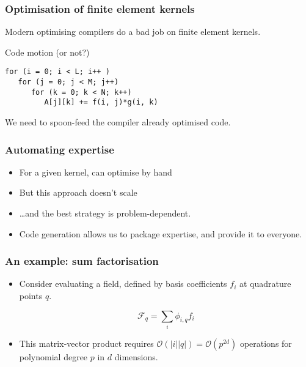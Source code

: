 \documentclass[presentation]{beamer}
\begin{document}
\begin{frame}[fragile]
  \frametitle{Optimisation of finite element kernels}
  
  \begin{problem}
    Modern optimising compilers do a bad job on finite element
    kernels.
  \end{problem}
  \begin{exampleblock}{Code motion (or not?)}
\begin{verbatim}
for (i = 0; i < L; i++ )
   for (j = 0; j < M; j++)
      for (k = 0; k < N; k++)
         A[j][k] += f(i, j)*g(i, k)
\end{verbatim}
  \end{exampleblock}
  \begin{corollary}
    We need to spoon-feed the compiler already optimised code.
  \end{corollary}
\end{frame}

\begin{frame}
  \frametitle{Automating expertise}
  \begin{itemize}
  \item For a given kernel, can optimise by hand
  \item But this approach doesn't scale
  \item \dots and the best strategy is problem-dependent.
  \item Code generation allows us to package expertise, and provide it
    to everyone.
  \end{itemize}
\end{frame}

\begin{frame}
  \frametitle{An example: sum factorisation}
  \begin{itemize}
  \item Consider evaluating a field, defined by basis coefficients
    $f_i$ at quadrature points $q$.

  \begin{equation*}
    \mathcal{F}_q = \sum_i \phi_{i,q} f_i
  \end{equation*}

  \item This matrix-vector product requires $\mathcal{O}(|i||q|) =
    \mathcal{O}(p^{2d})$ operations for polynomial degree $p$ in $d$
    dimensions.
\end{itemize}
\end{frame}
\end{document}
